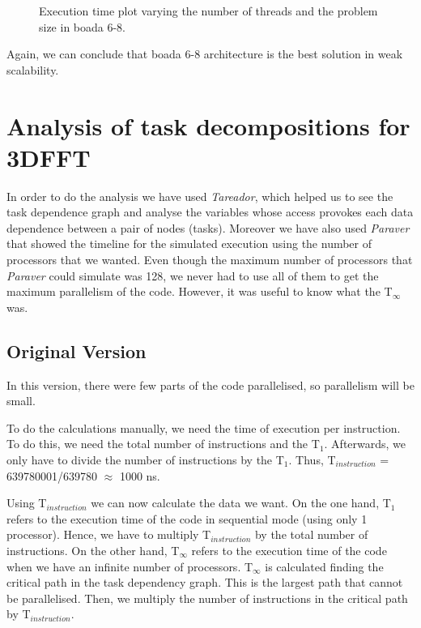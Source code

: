 \documentclass[12pt, a4paper]{article}
\begin{document}
\begin{figure}[ht]
\begin{minipage}[b]{0.30\linewidth}
\caption{Execution time plot varying the number of threads and the problem size in boada 6-8.}
\label{fig:weak_v8}
\end{minipage}
\end{figure}

Again, we can conclude that boada 6-8 architecture is the best solution in weak scalability.

\section{Analysis of task decompositions for 3DFFT}

In order to do the analysis we have used \textit{Tareador}, which helped us to see the task dependence graph and analyse  the variables whose access provokes each data dependence between a pair of nodes (tasks). Moreover we have also used \textit{Paraver} that showed the timeline for the simulated execution using the number of processors that we wanted. Even though the maximum number of processors that \textit{Paraver} could simulate was 128, we never had to use all of them to get the maximum parallelism of the code. However, it was useful to know what the T$_\infty$ was.

\subsection{Original Version}

In this version, there were few parts of the code parallelised, so parallelism will be small.

To do the calculations manually, we need the time of execution per instruction. To do this, we need the total number of instructions and the T$_1$. Afterwards, we only have to divide the number of instructions by the T$_1$. Thus, T$_{instruction}$ = 639780001/639780 $\approx$ 1000 ns.

Using T$_{instruction}$ we can now calculate the data we want. On the one hand, T$_1$ refers to the execution time of the code in sequential mode (using only 1 processor). Hence, we have to multiply T$_{instruction}$ by the total number of instructions. On the other hand, T$_\infty$ refers to the execution time of the code when we have an infinite number of processors. T$_\infty$ is calculated finding the critical path in the task dependency graph. This is the largest path that cannot be parallelised. Then, we multiply the number of instructions in the critical path by T$_{instruction}$.
\end{document}
